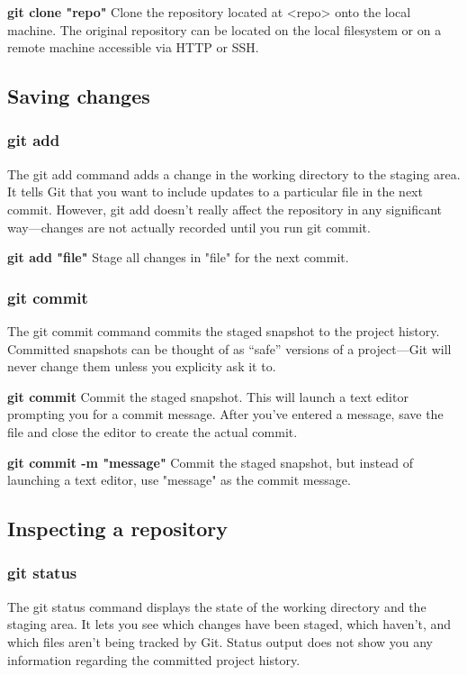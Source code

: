 \documentclass{article}
\begin{document}
	    \textbf{git clone "repo"}
		Clone the repository located at <repo> onto the local machine. The original repository can be located on the local filesystem or on a remote machine accessible via HTTP or SSH.
	
	\subsection{Saving changes}
	\subsubsection{git add}
		The git add command adds a change in the working directory to the staging area. It tells Git that you want to include updates to a particular file in the next commit. However, git add doesn't really affect the repository in any significant way—changes are not actually recorded until you run git commit.

		\textbf{git add "file"}
		Stage all changes in "file" for the next commit.
	
	\subsubsection{git commit}
		The git commit command commits the staged snapshot to the project history. Committed snapshots can be thought of as “safe” versions of a project—Git will never change them unless you explicity ask it to. 

		\textbf{git commit}
		Commit the staged snapshot. This will launch a text editor prompting you for a commit message. After you’ve entered a message, save the file and close the editor to create the actual commit. 

		\textbf{git commit -m "message"}
		Commit the staged snapshot, but instead of launching a text editor, use "message" as the commit message.	
	\subsection{Inspecting a repository}
	\subsubsection{git status}
		The git status command displays the state of the working directory and the staging area. It lets you see which changes have been staged, which haven’t, and which files aren’t being tracked by Git. Status output does not show you any information regarding the committed project history.
\end{document}
